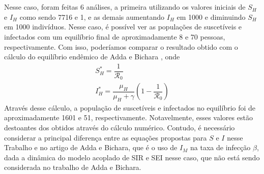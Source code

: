 \\\\
Nesse caso, foram feitas 6 análises, a primeira utilizando os
valores iniciais de $S_H$ e $I_H$ como sendo 7716 e 1, e as demais aumentando $I_H$ 
em 1000 e diminuindo $S_H$ em 1000 indivíduos. Nesse caso, é possível
ver as populações de suscetíveis e infectados com um equilíbrio final de
aproximadamente 8 e 70 pessoas, respectivamente. Com isso,
poderíamos comparar o resultado obtido com o cálculo do equilíbrio endêmico de Adda e Bichara
\cite{adda2011global}, onde
\begin{gather*}
        S_H^* = \dfrac{1}{\mathcal{R}_0} \\
        I_H^* = \dfrac{\mu_H}{\mu_H+\gamma}(1-\dfrac{1}{\mathcal{R}_0})
\end{gather*}       
Através desse cálculo, a população de suscetíveis e infectados no equilíbrio 
foi de aproximadamente 1601 e 51, respectivamente. Notavelmente, esses valores 
estão destoantes dos 
obtidos através do cálculo numérico. Contudo, é necessário considerar a principal diferença entre as equações
propostas para $S$ e $I$ nesse Trabalho e no artigo de Adda e Bichara, que é o uso de
$I_M$ na taxa de infecção $\beta$, dada a dinâmica do modelo 
acoplado de SIR e SEI nesse caso, que não está sendo considerada no trabalho
de Adda e Bichara.
